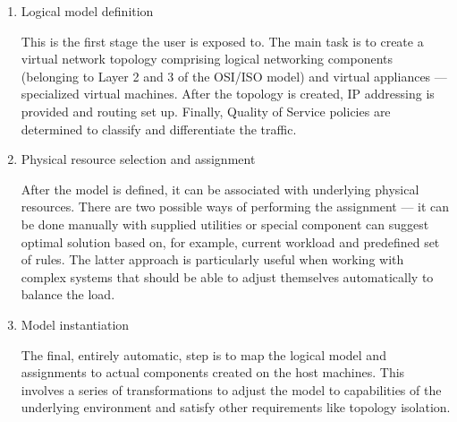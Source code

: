 \documentclass[11pt]{book}
\begin{document}
          \begin{enumerate}

            \item Logical model definition

              This is the first stage the user is exposed to. The main task is to create a virtual network topology
              comprising logical networking components (belonging to Layer 2 and 3 of the \mbox{OSI/ISO} model) and
              virtual appliances --- specialized virtual machines. After the topology is created, IP addressing is
              provided and routing set up. Finally, Quality of Service policies are determined to classify and
              differentiate the traffic.

            \item Physical resource selection and assignment

              After the model is defined, it can be associated with underlying physical resources. There are two
              possible ways of performing the assignment --- it can be done manually with supplied utilities or special
              component can suggest optimal solution based on, for example, current workload and predefined set of
              rules. The latter approach is particularly useful when working with complex systems that should be able to
              adjust themselves automatically to balance the load.

            \item Model instantiation

              The final, entirely automatic, step is to map the logical model and assignments to actual components
              created on the host machines. This involves a series of transformations to adjust the model to
              capabilities of the underlying environment and satisfy other requirements like topology isolation.
                  
          \end{enumerate}
\end{document}
